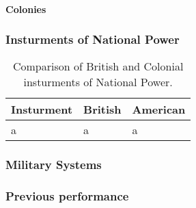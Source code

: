 \paragraph{Colonies}




\subsubsection{Insturments of National Power}

\begin{table}
  \begin{center}
  \begin{tabular}{lll}\toprule
    Insturment & British & American \\\midrule
	a & a & a \\\bottomrule
  \end{tabular}
  \end{center}
  \caption{Comparison of British and Colonial insturments of National Power.}
\end{table}

\subsubsection{Military Systems}

\subsubsection{Previous performance}

